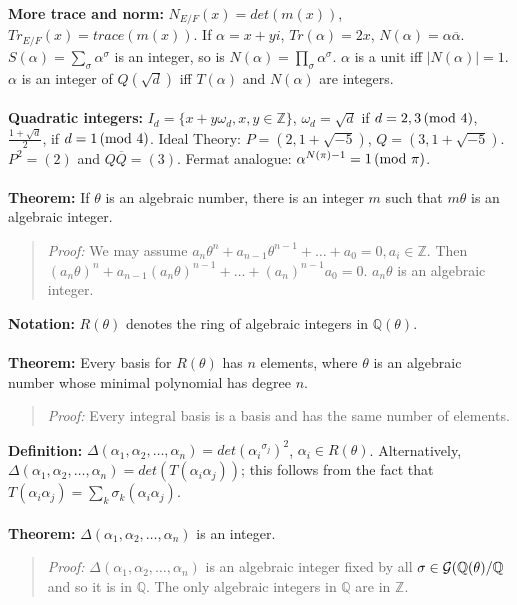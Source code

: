{\bf More trace and norm:}
$N_{E/F}(x)= det(m(x))$, $Tr_{E/F}(x)= trace(m(x))$.
If $\alpha= x+yi$, $Tr(\alpha)= 2x$, $N(\alpha)= \alpha {\overline
\alpha}$.
$S(\alpha)= \sum_{\sigma} \alpha^{\sigma}$ is an integer, so is
$N(\alpha)= \prod_{\sigma} \alpha^{\sigma}$. $\alpha$ is a  unit iff
$|N(\alpha)| = 1$.
$\alpha$ is an integer of $Q({\sqrt d})$ iff $T(\alpha)$ and $N(\alpha)$
are integers.
\\
\\
{\bf Quadratic integers:}
$I_d= \{x+y \omega_d, x,y \in {\mathbb Z} \}$,
$\omega_d = {\sqrt d}$ if
$d= 2,3 \thinspace \textnormal{(mod } 4 \textnormal{)}$,
${\frac { 1+{\sqrt d}} 2}$, if
$d= 1 \thinspace \textnormal{(mod } 4 \textnormal{)}$.
Ideal Theory:
$P= (2, 1+{\sqrt {-5}})$,
$Q= (3, 1+{\sqrt {-5}})$.  $P^2= (2)$ and $Q {\overline Q}= (3)$.
Fermat analogue: $\alpha^{N(\pi)-1}= 1 \thinspace \textnormal{(mod } \pi \textnormal{)}$.
\\
\\
{\bf Theorem:}
If $\theta$ is an algebraic number,
there is an integer $m$ such that $m \theta$ is an algebraic integer.
\begin{quote}
\emph{Proof:} We may assume 
$a_n \theta^n + a_{n-1} \theta^{n-1} + \ldots + a_0 =0, a_i \in {\mathbb Z}$.  Then
$(a_n \theta)^n + a_{n-1} (a_n \theta)^{n-1} + \ldots + (a_n)^{n-1}a_0 =0$.
$a_n \theta$ is an algebraic integer.
\end{quote}
{\bf Notation:} $R(\theta)$ denotes the ring of algebraic integers in ${\mathbb Q}(\theta)$.
\\
\\
{\bf Theorem:}
Every basis for $R(\theta)$ has $n$ elements, where $\theta$ is an algebraic number whose
minimal polynomial has degree $n$.
\begin{quote}
\emph{Proof:} Every integral basis is a basis and has the same number of elements.
\end{quote}
{\bf Definition:}
$\Delta(\alpha_1, \alpha_2, \ldots, \alpha_n) =
det({\alpha_i}^{\sigma_j})^2$, $\alpha_i \in R( \theta )$.
Alternatively,
$\Delta(\alpha_1, \alpha_2, \ldots, \alpha_n) =
det(T({\alpha_i}{\alpha_j}))$; this follows from the fact that 
$T(\alpha_i \alpha_j)= \sum_k \sigma_k(\alpha_i \alpha_j)$.
\\
\\
{\bf Theorem:}
$\Delta(\alpha_1, \alpha_2, \ldots, \alpha_n)$ is an integer.
\begin{quote}
\emph{Proof:} 
$\Delta(\alpha_1, \alpha_2, \ldots, \alpha_n)$ is an algebraic integer fixed by 
all $\sigma \in {\cal G}({\mathbb Q}(\theta)/{\mathbb Q}$ and so it is in ${\mathbb Q}$.
The only algebraic integers in ${\mathbb Q}$ are in ${\mathbb Z}$.
\end{quote}
